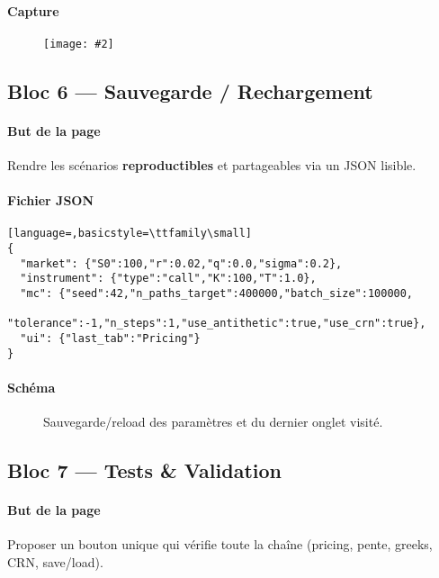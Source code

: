 \documentclass[11pt,a4paper]{article}
\newcommand{\imgfull}[2][\textwidth]{\begin{figure}[H]\centering\texttt{[image: \#2]}\end{figure}}
\begin{document}
\paragraph{Capture} \imgfull{stress.png}

\subsection*{Bloc 6 — Sauvegarde / Rechargement}\label{sec:bloc6}
\paragraph{But de la page} Rendre les scénarios \textbf{reproductibles} et partageables via un JSON lisible.

\paragraph{Fichier JSON}
\begin{lstlisting}[language=,basicstyle=\ttfamily\small]
{
  "market": {"S0":100,"r":0.02,"q":0.0,"sigma":0.2},
  "instrument": {"type":"call","K":100,"T":1.0},
  "mc": {"seed":42,"n_paths_target":400000,"batch_size":100000,
         "tolerance":-1,"n_steps":1,"use_antithetic":true,"use_crn":true},
  "ui": {"last_tab":"Pricing"}
}
\end{lstlisting}

\paragraph{Schéma}
\begin{figure}[H]\centering
{}
\caption{Sauvegarde/reload des paramètres et du dernier onglet visité.}
\end{figure}

\subsection*{Bloc 7 — Tests \& Validation}
\paragraph{But de la page} Proposer un bouton unique qui vérifie toute la chaîne (pricing, pente, greeks, CRN, save/load).
\end{document}
